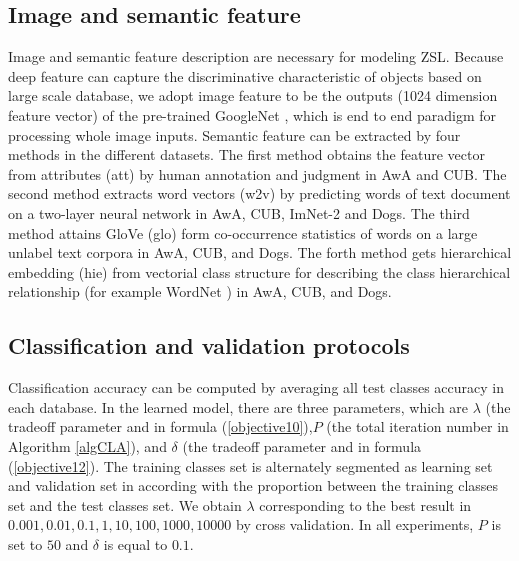\documentclass[review]{elsarticle}
\begin{document}
\subsection{Image and semantic feature}
\label{feature}
Image and semantic feature description are necessary for modeling ZSL. Because deep feature can capture the discriminative characteristic of objects based on large scale database, we adopt image feature to be the outputs (1024 dimension feature vector) of the pre-trained GoogleNet\cite{7298911} \cite{Szegedy2015Going}, which is end to end paradigm for processing whole image inputs. Semantic feature can be extracted by four methods in the different datasets. The first method obtains the feature vector from attributes (att)\cite{farhadi2009describing} by human annotation and judgment in AwA and CUB. The second method extracts word vectors (w2v) by predicting words of text document on a two-layer neural network \cite{Mikolov2013Distributed} in AwA, CUB, ImNet-2 and Dogs.  The third method attains GloVe (glo) form co-occurrence statistics of words on a large unlabel text corpora \cite{Pennington2014Glove} in AwA, CUB, and Dogs. The forth method gets hierarchical embedding (hie) from vectorial class structure for describing the class hierarchical relationship (for example WordNet \cite{7298911}\cite{Miller2002WordNet}) in AwA, CUB, and Dogs.

\subsection{Classification and validation protocols}
Classification accuracy can be computed by averaging all test classes accuracy in each database. In the learned model, there are three parameters, which are $\lambda$ (the tradeoff parameter and in formula (\ref{objective10}),$P$ (the total iteration number in Algorithm \ref{algCLA}), and $\delta$ (the tradeoff parameter and in formula (\ref{objective12}). The training classes set is alternately segmented as learning set and validation set in according with the proportion between the training classes set and the test classes set. We obtain $\lambda$ corresponding to the best result in $0.001,0.01,0.1, 1, 10, 100, 1000, 10000$ by cross validation. In all experiments, $P$ is set to $50$ and $\delta$ is equal to $0.1$.
\end{document}
